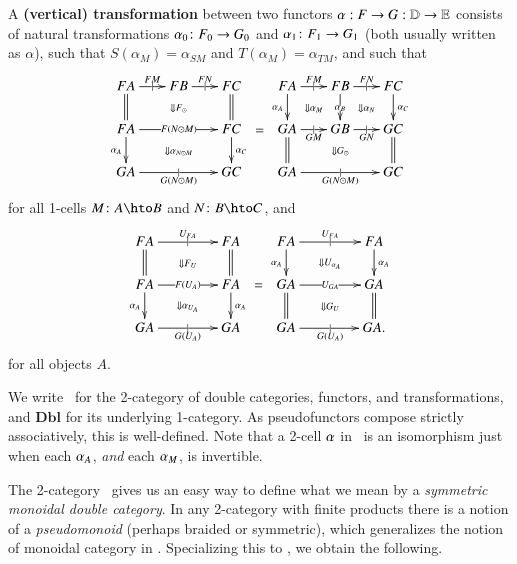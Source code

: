 \begin{defn}\label{thm:dbl-transf}
  A \textbf{(vertical) transformation} between two functors $\alpha:
  F\to G:\mathbb{D}\to\mathbb{E}$ consists of natural transformations $\alpha_0\colon
  F_0\to G_0$ and $\alpha_1\colon F_1\to G_1$ (both usually written as
  $\alpha$), such that $S(\alpha_{M}) = \alpha_{SM}$ and
  $T(\alpha_{M}) = \alpha_{TM}$, and such that
  \[\vcenter{\xymatrix@-.5pc{
      FA \ar@{=}[d] \ar[r]|{|}^{FM}
      \ar@{}[drr]|{\Downarrow F_\odot} &
      FB \ar[r]|{|}^{FN} &
      FC \ar@{=}[d]\\
      FA \ar[rr]|{F(N\odot M)} \ar[d]_{\alpha_A}
      \ar@{}[drr]|{\Downarrow \alpha_{N\odot M}} &&
      FC \ar[d]^{\alpha_C}\\
      GA \ar[rr]|{|}_{G(N\odot M)} && GC
    }} =
  \vcenter{\xymatrix@-.5pc{
      FA \ar[d]_{\alpha_A} \ar@{}[dr]|{\Downarrow \alpha_M} \ar[r]|{|}^{FM} &
      FB \ar[d]|{\alpha_B} \ar@{}[dr]|{\Downarrow \alpha_N} \ar[r]|{|}^{FN} &
      FC \ar[d]^{\alpha_C}\\
      GA \ar@{=}[d] \ar[r]|{|}_{GM} \ar@{}[drr]|{\Downarrow G_\odot} &
      GB \ar[r]|{|}_{GN} &
      GC \ar@{=}[d]\\
      GA \ar[rr]|{|}_{G(N\odot M)} && GC
    }}\]
  for all 1-cells $M\colon A\hto B$ and $N\colon B\hto C$, and
  \[\vcenter{\xymatrix@-.5pc{
      FA \ar[rr]|{|}^{U_{FA}} \ar@{=}[d]
      \ar@{}[drr]|{\Downarrow F_U} &&
      FA \ar@{=}[d]\\
      FA \ar[rr]|{F(U_A)} \ar[d]_{\alpha_A}
      \ar@{}[drr]|{\Downarrow \alpha_{U_A}} &&
      FA \ar[d]^{\alpha_A}\\
      GA \ar[rr]|{|}_{G(U_A)} && GA
    }} =
  \vcenter{\xymatrix@-.5pc{
      FA \ar[rr]|{|}^{U_{FA}} \ar[d]_{\alpha_A}
      \ar@{}[drr]|{\Downarrow U_{\alpha_A}} &&
      FA \ar[d]^{\alpha_A}\\
      GA \ar[rr]|{U_{GA}} \ar@{=}[d]
      \ar@{}[drr]|{\Downarrow G_U} &&
      GA \ar@{=}[d]\\
      GA \ar[rr]|{|}_{G(U_A)} && GA.
    }}\]
  for all objects $A$.
\end{defn}

We write \cDbl\ for the 2-category of double categories, functors, and
transformations, and $\mathbf{Dbl}$ for its underlying 1-category. As pseudofunctors compose strictly associatively, this is well-defined. Note that a 2-cell $\alpha$ in \cDbl\ is an isomorphism just when each
$\alpha_A$, \emph{and} each $\alpha_M$, is invertible.

The 2-category \cDbl\ gives us an easy way to define what we mean by a
\emph{symmetric monoidal double category}.  In any 2-category with
finite products there is a notion of a \emph{pseudomonoid} (perhaps braided or symmetric), which
generalizes the notion of monoidal category in \cCat.  Specializing
this to \cDbl, we obtain the following.

